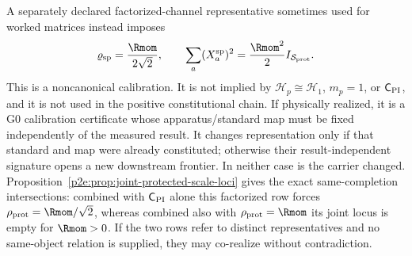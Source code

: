 \documentclass[11pt,a4paper]{article}
\begin{document}
A separately declared factorized-channel representative sometimes used for
worked matrices instead imposes
\[
        \varrho_{\rm sp}=\frac{\Rmom}{2\sqrt2},
        \qquad
        \sum_a(X_a^{\rm sp})^2
        =\frac{\Rmom^2}{2}I_{\mathcal S_{\rm prot}}.
\]
This is a noncanonical calibration.  It is not implied by
\(\mathcal H_p\cong\mathcal H_1\), \(m_p=1\), or \(\mathsf C_{\rm PI}\), and
it is not used in the positive constitutional chain.  If physically realized,
it is a G0 calibration certificate whose apparatus/standard map must be fixed
independently of the measured result.  It changes representation only if that
standard and map were already constituted; otherwise their result-independent
signature opens a new downstream frontier.  In neither case is the carrier
changed.  Proposition~\ref{p2e:prop:joint-protected-scale-loci} gives the exact
same-completion intersections: combined with
\(\mathsf C_{\rm PI}\) alone this factorized row forces
\(\rho_{\rm prot}=\Rmom/\sqrt2\), whereas combined also with
\(\rho_{\rm prot}=\Rmom\) its joint locus is empty for \(\Rmom>0\).
If the two rows refer to distinct representatives and no same-object relation
is supplied, they may co-realize without contradiction.
\end{document}
